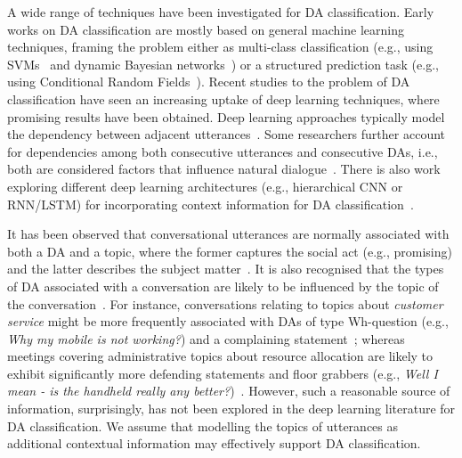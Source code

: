\documentclass[11pt,a4paper]{article}
\begin{document}
A wide range of techniques have been investigated for DA classification. Early works on DA classification are mostly based on general machine learning techniques, framing the problem either as multi-class classification (e.g., using  SVMs~\cite{liu2006using} and dynamic Bayesian networks~\cite{dielmann2008recognition}) or a structured prediction task (e.g., using Conditional Random Fields~\cite[CRF]{kim2010classifying,chen2018dialogue,raheja2019dialogue}).
Recent studies to the problem of DA classification have seen an increasing uptake of deep learning techniques, where promising results have been obtained. 
Deep learning approaches typically model the dependency between adjacent utterances~\cite{ji2016latent,lee2016sequential}. Some researchers further account for dependencies among both consecutive utterances and consecutive DAs, i.e., both are considered factors that influence natural dialogue~\cite{kumar2017dialogue,chen2018dialogue}. 
There is also work exploring different deep learning architectures (e.g., hierarchical CNN or RNN/LSTM) for incorporating context information for DA classification~\cite{liu2017using}. 

It has been observed that conversational utterances are normally associated with both a DA and a topic, where the former captures the social act (e.g., promising) and the latter describes the subject matter~\cite{wallace2013generative}. 
It is also recognised that the types of DA associated with a conversation are likely to be influenced by the topic of the conversation~\cite{searle1969speech,wallace2013generative}. For instance, conversations relating to topics about \textit{customer service} might be more frequently associated with DAs of type Wh-question (e.g., \textit{Why my mobile is not working?}) and a complaining statement~\cite{bhuiyan2018don}; whereas meetings covering administrative topics about resource allocation are likely to exhibit significantly more defending statements and floor grabbers (e.g., \textit{Well I mean -  is the handheld really any better?})~\cite{wrede2003relationship}. 
However, such a reasonable source of information, surprisingly, has not been explored in the deep learning literature for DA classification. 
We assume that modelling the topics of utterances as additional contextual information
may effectively support DA classification. 
\end{document}
